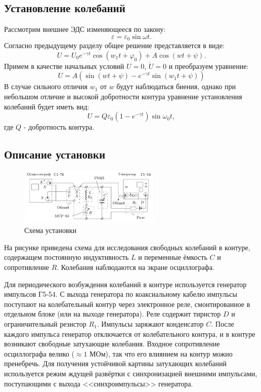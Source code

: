 \documentclass[12pt]{article}
\begin{document}
\subsection*{Установление колебаний}
Рассмотрим внешнее ЭДС изменяющееся по закону:
\[
	\varepsilon = \varepsilon_0 \sin \omega t.
\]
Согласно предыдущему разделу общее решение представляется в виде: 
\[
	U = U_0 e^{-\gamma t} \cos (w_1 t + \varphi_0) + A \cos (wt + \psi).
\] 
Примем в качестве начальных условий $U = 0$, $\dot{U} = 0$ и преобразуем уравнение: 
\[
	U = A \left( \sin (wt + \psi) - e^{-\gamma t} \sin (w_1 t + \psi) \right) 
\]
В случае сильного отличия $w_1$ от $w$ будут наблюдаться биения, однако при небольшом отличие и высокой 
добротности контура уравнение установления колебаний будет иметь вид: 
\begin{equation}
	U = Q \varepsilon_0 \left( 1 - e^{-\gamma t} \right) \sin \omega_0 t,  
\end{equation}  
где $Q$ - добротность контура. 


\subsection*{Описание установки}
\begin{figure}[H]
	\centering
	\includegraphics[width=0.6\textwidth]{1.png}
	\caption{Схема установки}
	\label{pic:scheme}
\end{figure}
На рисунке приведена схема для исследования свободных колебаний в контуре, содержащем постоянную индуктивность $L$ и переменные ёмкость $C$ и сопротивление $R$. Колебания наблюдаются на экране осциллографа.

Для периодического возбуждения колебаний в контуре используется генератор импульсов Г5-54. С выхода генератора по коаксиальному кабелю импульсы поступают на колебательный контур через электронное реле, смонтированное в отдельном блоке (или на выходе генератора). Реле содержит тиристор $D$ и ограничительный резистор $R_1$.
Импульсы заряжают конденсатор $C$. После каждого импульса генератор отключается от колебательного контура, и в контуре возникают свободные затухающие колебания. Входное сопротивление осциллографа велико ($\approx 1$ МОм), так что его влиянием на контур можно пренебречь. Для получения устойчивой картины затухающих колебаний используется режим ждущей развёртки с синхронизацией внешними импульсами, поступающими с выхода <<синхроимпульсы>> генератора.
\end{document}
